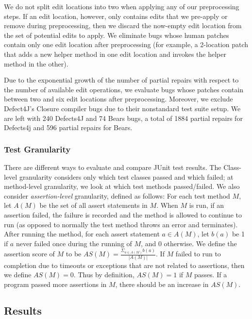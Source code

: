 \documentclass[sigconf, timestamp-false, anonymous=true]{acmart}
\begin{document}
We do not split edit locations into two when applying any of our preprocessing steps. 
If an edit location, however, only contains edits that we pre-apply or remove during 
preprocessing, then we discard the now-empty edit location from the set of 
potential edits to apply. We eliminate bugs whose human patches contain only 
one edit location after preprocessing (for example, a 2-location patch that adds a new 
helper method in one edit location and invokes the helper method in the other). 

Due to the exponential growth of the number of partial repairs with respect 
to the number of available edit operations, we evaluate bugs whose patches 
contain between two and six edit locations after preprocessing.
Moreover, we exclude Defect4J's Closure compiler bugs due to 
their nonstandard test suite setup.
We are left with 240 Defects4J and 74 Bears bugs, a total of 1884 partial repairs for Defects4j 
and 596 partial repairs for Bears.

\subsubsection{Test Granularity}

There are different ways to evaluate and compare JUnit test results. The Class-level granularity 
considers only which test classes passed and which failed; at method-level 
granularity, we look at which test methods passed/failed.
We also consider \emph{assertion-level} granularity, defined as follows:
For each test method $M$, let $A(M)$ be the set of all assert statements in $M$. 
When $M$ is run, if an assertion failed, the failure is recorded and the method 
is allowed to continue to run (as opposed to normally the test method throws an 
error and terminates). After running the method, for each assert statement 
$a\in A(M)$, let $b(a)$ be 1 if $a$ never failed once during the running of $M$, 
and 0 otherwise. We define the assertion score of $M$ to be 
$AS(M)=\frac{\Sigma_{a\in A(M)}b(a)}{|A(M)|}$. If $M$ failed to run to completion 
due to timeouts or exceptions that are not related to assertions, then we define 
$AS(M)=0$. Thus by definition, $AS(M)=1$ if $M$ passes. If a program passed more 
assertions in $M$, there should be an increase in $AS(M)$.


\subsection{Results}
\end{document}
